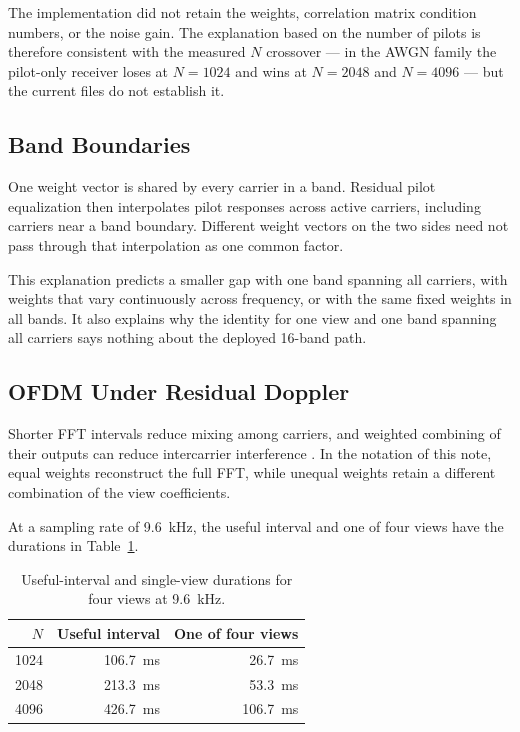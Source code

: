 \documentclass[11pt]{article}
\begin{document}
The implementation did not retain the weights, correlation matrix condition
numbers, or the noise gain.  The explanation based on the number of pilots is
therefore consistent with the measured $N$ crossover --- in the AWGN family
the pilot-only receiver loses at $N=1024$ and wins at $N=2048$ and $N=4096$
--- but the current files do not establish it.

\subsection{Band Boundaries}

One weight vector is shared by every carrier in a band.  Residual pilot
equalization then interpolates pilot responses across active carriers,
including carriers near a band boundary.  Different weight vectors on the two
sides need not pass through that interpolation as one common factor.

This explanation predicts a smaller gap with one band spanning all carriers, with weights
that vary continuously across frequency, or with the same fixed weights in
all bands.  It also explains why the identity for one view and one band spanning
all carriers says
nothing about the deployed 16-band path.

\subsection{OFDM Under Residual Doppler}

Shorter FFT intervals reduce mixing among carriers, and weighted combining of
their outputs can reduce intercarrier interference
\cite{yerramalli}.  In the notation of this note, equal weights reconstruct
the full FFT, while unequal weights retain a different combination of the
view coefficients.

At a sampling rate of 9.6~kHz, the useful interval and one of four views have
the durations in Table~\ref{tab:duration}.

\begin{table}[ht]
\centering
\caption{Useful-interval and single-view durations for four views at 9.6~kHz.}
\label{tab:duration}
\begin{tabular}{@{}rrr@{}}
\toprule
$N$ & Useful interval & One of four views \\
\midrule
1024 & 106.7~ms & 26.7~ms \\
2048 & 213.3~ms & 53.3~ms \\
4096 & 426.7~ms & 106.7~ms \\
\bottomrule
\end{tabular}
\end{table}
\end{document}
